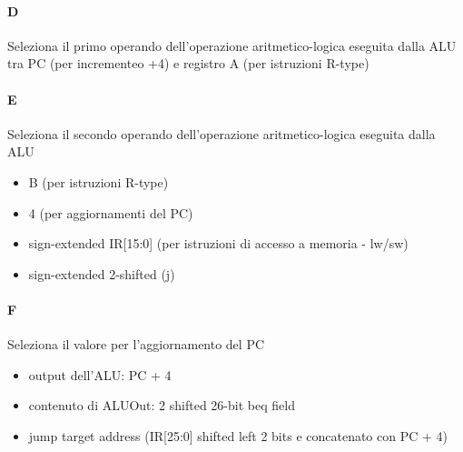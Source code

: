 \documentclass[12pt, a4paper, openany]{book}
\begin{document}
\paragraph*{D} Seleziona il primo operando dell'operazione aritmetico-logica eseguita
dalla ALU tra PC (per incrementeo +4) e registro A (per istruzioni R-type)
\paragraph*{E} Seleziona il secondo operando dell'operazione aritmetico-logica eseguita
dalla ALU
\begin{itemize}
    \item B (per istruzioni R-type)
    \item 4 (per aggiornamenti del PC)
    \item sign-extended IR[15:0] (per istruzioni di accesso a memoria - lw/sw)
    \item sign-extended 2-shifted (j)
\end{itemize}
\paragraph*{F} Seleziona il valore per l'aggiornamento del PC
\begin{itemize}
    \item output dell'ALU: PC + 4
    \item contenuto di ALUOut: 2 shifted 26-bit beq field
    \item jump target address (IR[25:0] shifted left 2 bits e concatenato con PC + 4)
\end{itemize}
\end{document}
